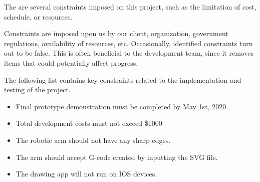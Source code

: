 The are  several constraints imposed on this project, such as the limitation of cost, schedule, or resources.  

Constraints are imposed upon us by our client, organization, government regulations, availability of resources, etc. Occasionally, identified constraints turn out to be false. This is often beneficial to the development team, since it removes items that could potentially affect progress.

The following list contains key constraints related to the implementation and testing of the project.

\begin{itemize}
  \item Final prototype demonstration must be completed by May 1st, 2020
  \item Total development costs must not exceed \$1000
  \item The robotic arm should not have any sharp edges.
  \item The arm should accept G-code created by inputting the SVG file.
  \item The drawing app will not run on IOS devices. 
\end{itemize}
